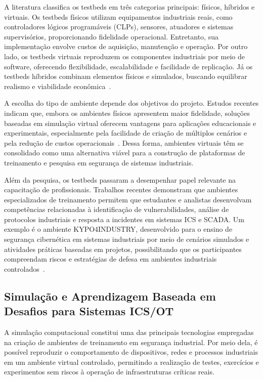 \documentclass[conference]{IEEEtran}
\begin{document}
A literatura classifica os testbeds em três categorias principais: físicos, híbridos e virtuais. Os testbeds físicos utilizam equipamentos industriais reais, como controladores lógicos programáveis (CLPs), sensores, atuadores e sistemas supervisórios, proporcionando fidelidade operacional. Entretanto, sua implementação envolve custos de aquisição, manutenção e operação. Por outro lado, os testbeds virtuais reproduzem os componentes industriais por meio de software, oferecendo flexibilidade, escalabilidade e facilidade de replicação. Já os testbeds híbridos combinam elementos físicos e simulados, buscando equilibrar realismo e viabilidade econômica~\cite{shamsuzzaman2024}.

A escolha do tipo de ambiente depende dos objetivos do projeto. Estudos recentes indicam que, embora os ambientes físicos apresentem maior fidelidade, soluções baseadas em simulação virtual oferecem vantagens para aplicações educacionais e experimentais, especialmente pela facilidade de criação de múltiplos cenários e pela redução de custos operacionais~\cite{shamsuzzaman2024}. Dessa forma, ambientes virtuais têm se consolidado como uma alternativa viável para a construção de plataformas de treinamento e pesquisa em segurança de sistemas industriais.

Além da pesquisa, os testbeds passaram a desempenhar papel relevante na capacitação de profissionais. Trabalhos recentes demonstram que ambientes especializados de treinamento permitem que estudantes e analistas desenvolvam competências relacionadas à identificação de vulnerabilidades, análise de protocolos industriais e resposta a incidentes em sistemas ICS e SCADA. Um exemplo é o ambiente KYPO4INDUSTRY, desenvolvido para o ensino de segurança cibernética em sistemas industriais por meio de cenários simulados e atividades práticas baseadas em projetos, possibilitando que os participantes compreendam riscos e estratégias de defesa em ambientes industriais controlados~\cite{celeda2020}.

\subsection{Simulação e Aprendizagem Baseada em Desafios para Sistemas ICS/OT}

A simulação computacional constitui uma das principais tecnologias empregadas na criação de ambientes de treinamento em segurança industrial. Por meio dela, é possível reproduzir o comportamento de dispositivos, redes e processos industriais em um ambiente virtual controlado, permitindo a realização de testes, exercícios e experimentos sem riscos à operação de infraestruturas críticas reais.
\end{document}
